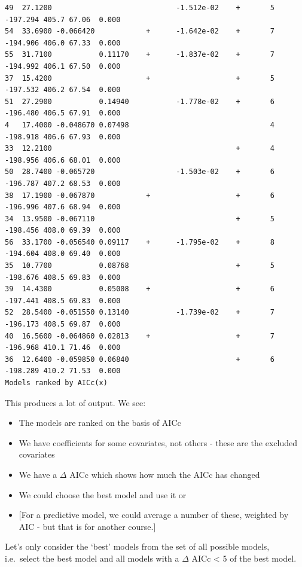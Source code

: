 \documentclass[
  oneside]{krantz}
\providecommand{\tightlist}{%
  \setlength{\itemsep}{0pt}\setlength{\parskip}{0pt}}
\begin{document}
\begin{verbatim}
49  27.1200                             -1.512e-02    +       5 -197.294 405.7 67.06  0.000
54  33.6900 -0.066420            +      -1.642e-02    +       7 -194.906 406.0 67.33  0.000
55  31.7100           0.11170    +      -1.837e-02    +       7 -194.992 406.1 67.50  0.000
37  15.4200                      +                    +       5 -197.532 406.2 67.54  0.000
51  27.2900           0.14940           -1.778e-02    +       6 -196.480 406.5 67.91  0.000
4   17.4000 -0.048670 0.07498                                 4 -198.918 406.6 67.93  0.000
33  12.2100                                           +       4 -198.956 406.6 68.01  0.000
50  28.7400 -0.065720                   -1.503e-02    +       6 -196.787 407.2 68.53  0.000
38  17.1900 -0.067870            +                    +       6 -196.996 407.6 68.94  0.000
34  13.9500 -0.067110                                 +       5 -198.456 408.0 69.39  0.000
56  33.1700 -0.056540 0.09117    +      -1.795e-02    +       8 -194.604 408.0 69.40  0.000
35  10.7700           0.08768                         +       5 -198.676 408.5 69.83  0.000
39  14.4300           0.05008    +                    +       6 -197.441 408.5 69.83  0.000
52  28.5400 -0.051550 0.13140           -1.739e-02    +       7 -196.173 408.5 69.87  0.000
40  16.5600 -0.064860 0.02813    +                    +       7 -196.968 410.1 71.46  0.000
36  12.6400 -0.059850 0.06840                         +       6 -198.289 410.2 71.53  0.000
Models ranked by AICc(x) 
\end{verbatim}

\normalsize

This produces a lot of output. We see:

\begin{itemize}
\tightlist
\item
  The models are ranked on the basis of AICc
\item
  We have coefficients for some covariates, not others - these are the excluded covariates
\item
  We have a \(\Delta\) AICc which shows how much the AICc has changed
\item
  We could choose the best model and use it or
\item
  {[}For a predictive model, we could average a number of these, weighted by AIC - but that is for another course.{]}
\end{itemize}

Let's only consider the `best' models from the set of all possible models, i.e.~select the best model and all models with a \(\Delta\) AICc \textless{} 5 of the best model.
\end{document}
